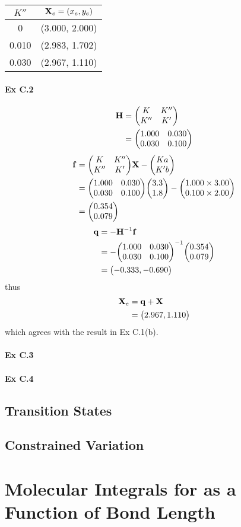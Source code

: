\documentclass[a4paper]{article}
\newcommand{\ex}[1]{\paragraph{Ex #1}}
\numberwithin{equation}{subsection}
\begin{document}
\begin{table}
	\centering
	\begin{tabular}{cc}
		\hline
		$ K'' $ & $ \vb{X}_e = (x_e, y_e) $\\ \hline
		0 & (3.000, 2.000)\\
		0.010 & (2.983, 1.702)\\
		0.030 & (2.967, 1.110)\\ \hline
	\end{tabular}
\end{table}

\ex{C.2}
\begin{align}
\vb{H} 
&= \mqty(K & K'' \\ K'' & K') \notag\\
&= \mqty(1.000 & 0.030\\ 0.030 & 0.100)
\end{align}
\begin{align}
\vb{f} 
&= \mqty(K & K'' \\ K'' & K')\vb{X} - \mqty(K a \\ K' b) \notag\\
&= \mqty(1.000 & 0.030\\ 0.030 & 0.100)\mqty(3.3\\ 1.8) 
- \mqty(1.000\times 3.00\\ 0.100\times 2.00) \notag\\
&= \mqty(0.354\\ 0.079)
\end{align}
\begin{align}
\vb{q} &= -\vb{H}^{-1}\vb{f} \notag\\
&= -\mqty(1.000 & 0.030\\ 0.030 & 0.100)^{-1} \mqty(0.354\\ 0.079) \notag\\
&= \mqty(-0.333, -0.690)
\end{align}
thus
\begin{align}
\vb{X}_e &= \vb{q} + \vb{X} \notag\\
&= \mqty(2.967, 1.110)
\end{align}
which agrees with the result in Ex C.1(b).

\ex{C.3}


\ex{C.4}

\subsection{Transition States}

\subsection{Constrained Variation}

\section{Molecular Integrals for  as a Function of Bond Length}
\end{document}
